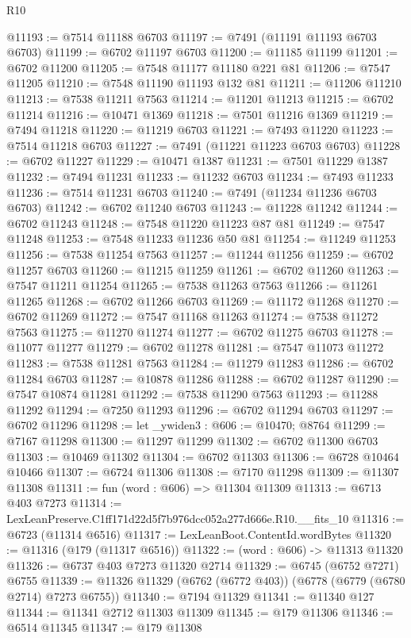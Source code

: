 \begin{lexlean}{R10}
\begin{coremodule}
@11193 := @7514 @11188 @6703
@11197 := @7491 (@11191 @11193 @6703 @6703)
@11199 := @6702 @11197 @6703
@11200 := @11185 @11199
@11201 := @6702 @11200
@11205 := @7548 @11177 @11180 @221 @81
@11206 := @7547 @11205
@11210 := @7548 @11190 @11193 @132 @81
@11211 := @11206 @11210
@11213 := @7538 @11211 @7563
@11214 := @11201 @11213
@11215 := @6702 @11214
@11216 := @10471 @1369
@11218 := @7501 @11216 @1369
@11219 := @7494 @11218
@11220 := @11219 @6703
@11221 := @7493 @11220
@11223 := @7514 @11218 @6703
@11227 := @7491 (@11221 @11223 @6703 @6703)
@11228 := @6702 @11227
@11229 := @10471 @1387
@11231 := @7501 @11229 @1387
@11232 := @7494 @11231
@11233 := @11232 @6703
@11234 := @7493 @11233
@11236 := @7514 @11231 @6703
@11240 := @7491 (@11234 @11236 @6703 @6703)
@11242 := @6702 @11240 @6703
@11243 := @11228 @11242
@11244 := @6702 @11243
@11248 := @7548 @11220 @11223 @87 @81
@11249 := @7547 @11248
@11253 := @7548 @11233 @11236 @50 @81
@11254 := @11249 @11253
@11256 := @7538 @11254 @7563
@11257 := @11244 @11256
@11259 := @6702 @11257 @6703
@11260 := @11215 @11259
@11261 := @6702 @11260
@11263 := @7547 @11211 @11254
@11265 := @7538 @11263 @7563
@11266 := @11261 @11265
@11268 := @6702 @11266 @6703
@11269 := @11172 @11268
@11270 := @6702 @11269
@11272 := @7547 @11168 @11263
@11274 := @7538 @11272 @7563
@11275 := @11270 @11274
@11277 := @6702 @11275 @6703
@11278 := @11077 @11277
@11279 := @6702 @11278
@11281 := @7547 @11073 @11272
@11283 := @7538 @11281 @7563
@11284 := @11279 @11283
@11286 := @6702 @11284 @6703
@11287 := @10878 @11286
@11288 := @6702 @11287
@11290 := @7547 @10874 @11281
@11292 := @7538 @11290 @7563
@11293 := @11288 @11292
@11294 := @7250 @11293
@11296 := @6702 @11294 @6703
@11297 := @6702 @11296
@11298 := let _ywiden3 : @606 := @10470; @8764
@11299 := @7167 @11298
@11300 := @11297 @11299
@11302 := @6702 @11300 @6703
@11303 := @10469 @11302
@11304 := @6702 @11303
@11306 := @6728 @10464 @10466
@11307 := @6724 @11306
@11308 := @7170 @11298
@11309 := @11307 @11308
@11311 := fun (word : @606) => @11304 @11309
@11313 := @6713 @403 @7273
@11314 := LexLeanPreserve.C1ff171d22d5f7b976dcc052a277d666e.R10.__fits_10
@11316 := @6723 (@11314 @6516)
@11317 := LexLeanBoot.ContentId.wordBytes
@11320 := @11316 (@179 (@11317 @6516))
@11322 := (word : @606) -> @11313 @11320
@11326 := @6737 @403 @7273 @11320 @2714
@11329 := @6745 (@6752 @7271) @6755
@11339 := @11326 @11329 (@6762 (@6772 @403)) (@6778 (@6779 (@6780 @2714) @7273 @6755))
@11340 := @7194 @11329
@11341 := @11340 @127
@11344 := @11341 @2712 @11303 @11309
@11345 := @179 @11306
@11346 := @6514 @11345
@11347 := @179 @11308

\end{coremodule}
\end{lexlean}
